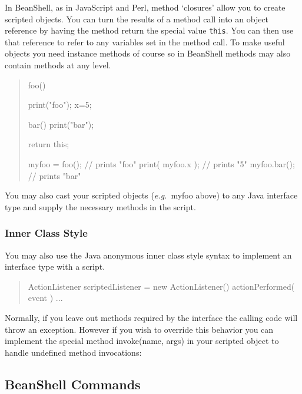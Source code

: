 \documentclass[twoside,11pt,nolof]{starlink}
\providecommand{\eg}{\textit{e.g.}}
\begin{document}
In BeanShell, as in JavaScript and Perl, method `closures' allow you
to create scripted objects.  You can turn the results of a method call
into an object reference by having the method return the special value
\texttt{this}.  You can then use that reference to refer to
any variables set in the method call.  To make useful objects you need
instance methods of course so in BeanShell methods may also contain
methods at any level.
\begin{quote}
\begin{terminalv}
    foo() {
        print("foo");
        x=5;

        bar() {
            print("bar");
        }

        return this;
    }

    myfoo = foo();    // prints "foo"
    print( myfoo.x ); // prints "5"
    myfoo.bar();      // prints "bar"
\end{terminalv}
\end{quote}

You may also cast your scripted objects (\eg\ myfoo above) to any Java
interface type and supply the necessary methods in the script.

\subsubsection{Inner Class Style}

You may also use the Java anonymous inner class style syntax to implement an
interface type with a script.
\begin{quote}
\begin{terminalv}
    ActionListener scriptedListener = new ActionListener() {
        actionPerformed( event ) { ... }
    }
\end{terminalv}
\end{quote}
Normally, if you leave out methods required by the interface the calling code
will throw an exception.  However if you wish to override this behavior
you can implement the special method invoke(name, args) in your scripted
object to handle undefined method invocations:
\begin{quote}
\begin{terminalv}
    ml = new MouseListener() {
        mousePressed( event ) { ... }
        // handle the rest
        invoke( name, args ) { print("Method: "+name+" invoked!");
    }
\end{terminalv}
\end{quote}

\subsection{BeanShell Commands}
\end{document}
